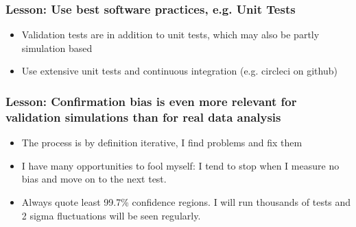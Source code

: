 \documentclass{beamer}
\begin{document}
\frame
{
    \frametitle{Lesson: Use best software practices, e.g. Unit Tests}

    \begin{itemize}

        \item Validation tests are in addition to unit tests, which may also be
            partly simulation based

        \item Use extensive unit tests and continuous integration (e.g. circleci
            on github)

    \end{itemize}

}

\frame
{

    \frametitle{Lesson: Confirmation bias is even more relevant for validation
    simulations than for real data analysis }

    \begin{itemize}

        \item The process is by definition iterative, I find problems and fix
            them

        \item I have many opportunities to fool myself:  I tend to stop when I
            measure no bias and move on to the next test.

        \item Always quote least 99.7\% confidence regions.  I will run
            thousands of tests and 2 sigma fluctuations will be seen regularly.

    \end{itemize}

}
\end{document}
